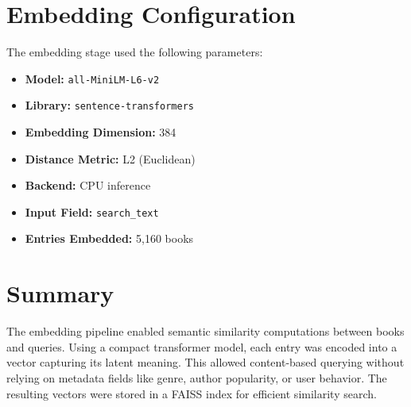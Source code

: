 \section{Embedding Configuration}
\label{sec:embedding-config}

The embedding stage used the following parameters:
\begin{itemize}
    \item \textbf{Model:} \texttt{all-MiniLM-L6-v2}
    \item \textbf{Library:} \texttt{sentence-transformers}
    \item \textbf{Embedding Dimension:} 384
    \item \textbf{Distance Metric:} L2 (Euclidean)
    \item \textbf{Backend:} CPU inference
    \item \textbf{Input Field:} \texttt{search\_text}
    \item \textbf{Entries Embedded:} 5,160 books
\end{itemize}

\section{Summary}
\label{sec:embedding-summary}

The embedding pipeline enabled semantic similarity computations between books and queries. Using a compact transformer model, each entry was encoded into a vector capturing its latent meaning. 
This allowed content-based querying without relying on metadata fields like genre, author popularity, or user behavior. The resulting vectors were stored in a FAISS index for efficient similarity search.
